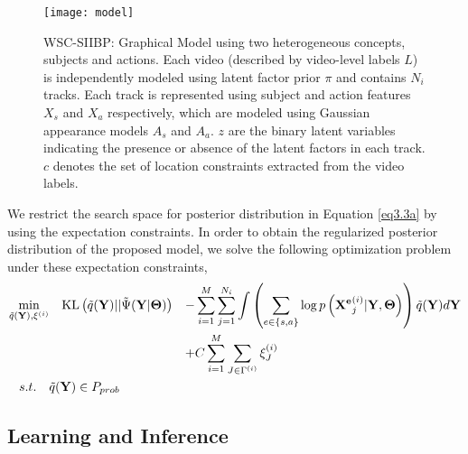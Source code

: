 \documentclass[runningheads]{llncs}
\begin{document}
\begin{figure}[!tp]
\begin{minipage}[c]{0.57\textwidth}
\texttt{[image: model]}
\end{minipage}\hfill
\begin{minipage}[c]{0.4\textwidth}
\caption{WSC-SIIBP: Graphical Model using two heterogeneous concepts, subjects and actions. Each video (described by video-level labels $L$) is independently modeled using latent factor prior $\pi$ and contains $N_i$ tracks. Each track is represented using subject and action features $X_s$ and $X_a$ respectively, which are modeled using Gaussian appearance models $A_s$ and $A_a$. $z$ are the binary latent variables indicating the presence or absence of the latent factors in each track. $c$ denotes the set of location constraints extracted from the video labels.}
\label{fig2}
\end{minipage}
\end{figure}

We restrict the search space for posterior distribution in Equation \eqref{eq3.3a} by using the expectation constraints. In order to obtain the regularized posterior distribution of the proposed model, we solve
the following optimization problem under these expectation constraints,
\vspace{-3mm}
\begin{align}
\min_{\tilde{q}(\mathbf{Y}), \mathbf{\xi}^{(i)}} &\quad \text{KL}\left(\tilde{q}(\mathbf{Y}) || \tilde{\Psi}(\mathbf{Y}|\mathbf{\Theta})\right) &-& \sum_{i=1}^M \sum_{j=1}^{N_i} \int \left(\sum_{e\in\{s,a\}}\log p\left(\mathbf{X^e}^{(i)}_j | \mathbf{Y}, \mathbf{\Theta}\right) \right) \tilde{q}(\mathbf{Y}) d\mathbf{Y} \nonumber \\
& & + & C \sum_{i=1}^M \sum_{J \in \Gamma^{(i)}} \xi^{(i)}_J \nonumber \\
s.t. \quad & \tilde{q}(\mathbf{Y}) \in P_{prob} && \label{eq11}
\vspace{-3mm}
\end{align}

\subsection{Learning and Inference}
\label{sec:proposed_inference}
\end{document}
